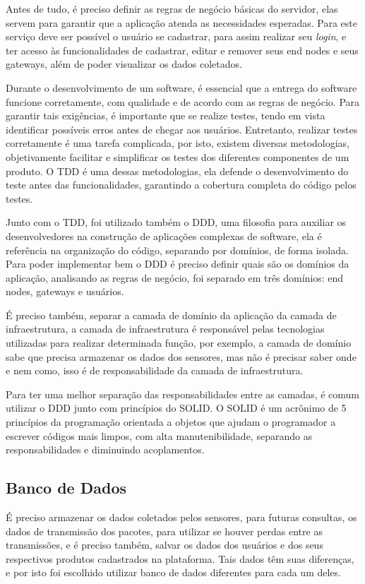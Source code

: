 Antes de tudo, é preciso definir as regras de negócio básicas do servidor, elas servem para garantir que a aplicação atenda as necessidades esperadas. Para este serviço deve ser possível o usuário se cadastrar, para assim realizar seu \textit{login}, e ter acesso às funcionalidades de cadastrar, editar e remover seus end nodes e seus gateways, além de poder visualizar os dados coletados.

Durante o desenvolvimento de um software, é essencial que a entrega do software funcione corretamente, com qualidade e de acordo com as regras de negócio. Para garantir tais exigências, é importante que se realize testes, tendo em vista identificar possíveis erros antes de chegar aos usuários. Entretanto, realizar testes corretamente é uma tarefa complicada, por isto, existem diversas metodologias, objetivamente facilitar e simplificar os testes dos diferentes componentes de um produto. O TDD é uma dessas metodologias, ela defende o desenvolvimento do teste antes das funcionalidades, garantindo a cobertura completa do código pelos testes.

Junto com o TDD, foi utilizado também o DDD, uma filosofia para auxiliar os desenvolvedores na construção de aplicações complexas de software, ela é referência na organização do código, separando por domínios, de forma isolada. Para poder implementar bem o DDD é preciso definir quais são os domínios da aplicação, analisando as regras de negócio, foi separado em três domínios: end nodes, gateways e usuários.

É preciso também, separar a camada de domínio da aplicação da camada de infraestrutura, a camada de infraestrutura é responsável pelas tecnologias utilizadas para realizar determinada função, por exemplo, a camada de domínio sabe que precisa armazenar os dados dos sensores, mas não é precisar saber onde e nem como, isso é de responsabilidade da camada de infraestrutura.

Para ter uma melhor separação das responsabilidades entre as camadas, é comum utilizar o DDD junto com princípios do SOLID. O SOLID é um acrônimo de 5 princípios da programação orientada a objetos que ajudam o programador a escrever códigos mais limpos, com alta manutenibilidade, separando as responsabilidades e diminuindo acoplamentos.

\subsection{Banco de Dados}
\label{metod:servidor:db}
É preciso armazenar os dados coletados pelos sensores, para futuras consultas, os dados de transmissão dos pacotes, para utilizar se houver perdas entre as transmissões, e é preciso também, salvar os dados dos usuários e dos seus respectivos produtos cadastrados na plataforma. Tais dados têm suas diferenças, e por isto foi escolhido utilizar banco de dados diferentes para cada um deles.
	
